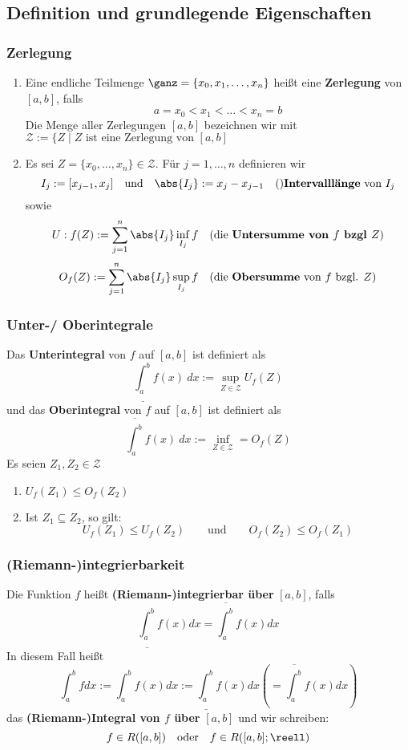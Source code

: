 \documentclass{kit}
\begin{document}
  \subsection{Definition und grundlegende Eigenschaften}
    \subsubsection{Zerlegung}
      \begin{enumerate}
        \item Eine endliche Teilmenge $\ganz=\{x_0,x_1,\dots,x_n\}$ heißt eine \textbf{Zerlegung} von $[a,b]$, falls
          $$a=x_0<x_1<\dots<x_n=b$$
          Die Menge aller Zerlegungen $[a,b]$ bezeichnen wir mit $\mathcal{Z}:=\{Z\mid Z\text{ ist eine Zerlegung von }[a,b]$
          \item Es sei $Z=\{x_0,\dots,x_n\}\in\mathcal{Z}$. Für $j=1,\dots,n$ definieren wir
          $$I_j:=[x_{j-1},x_j]\quad\text{und}\quad\abs{I_j}:=x_j-x_{j-1}\quad\text{()\textbf{Intervalllänge} von }I_j$$
          sowie
          $$U:f(Z):=\sum^n_{j=1}\abs{I_j}\inf_{I_j}f\quad\text{(die \textbf{Untersumme von $f$ bzgl $Z$})}$$
          $$O_f(Z):=\sum^n_{j=1}\abs{I_j}\sup_{I_j}f\quad\text{(die \textbf{Obersumme} von $f$ bzgl. $Z$)}$$
      \end{enumerate}
    \subsubsection{Unter-/ Oberintegrale}
      Das \textbf{Unterintegral} von $f$ auf $[a,b]$ ist definiert als
      $$\underline{\int^b_a}f(x)\ dx:=\sup_{Z\in\mathcal{Z}}U_f(Z)$$
      und das \textbf{Oberintegral} von $f$ auf $[a,b]$ ist definiert als
      $$\overline{\int^b_a}f(x)\ dx:=\inf_{Z\in\mathcal{Z}}=O_f(Z)$$
      Es seien $Z_1,Z_2\in\mathcal{Z}$
      \begin{enumerate}
        \item $U_f(Z_1)\le O_f(Z_2)$
        \item Ist $Z_1\subseteq Z_2$, so gilt:
          $$U_f(Z_1)\le U_f(Z_2)\qquad\text{und}\qquad O_f(Z_2)\le O_f(Z_1)$$
      \end{enumerate}
    \subsubsection{(Riemann-)integrierbarkeit}
      Die Funktion $f$ heißt \textbf{(Riemann-)integrierbar über} $[a,b]$, falls
      $$\underline{\int^b_a}f(x)dx=\overline{\int^b_a}f(x)dx$$
      In diesem Fall heißt
      $$\int^b_afdx:=\int^b_af(x)dx:=\underline{\int^b_a}f(x)dx\left(=\overline{\int^b_a}f(x)dx\right)$$
      das \textbf{(Riemann-)Integral von $f$ über} $[a,b]$ und wir schreiben:
      $$f\in R([a,b])\quad\text{oder}\quad f\in R([a,b];\reell)$$
\end{document}
